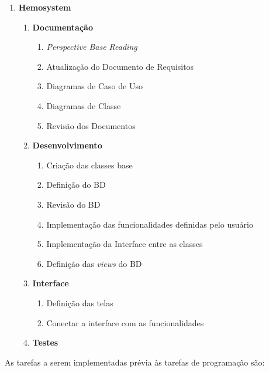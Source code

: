 \documentclass[12pt,a4paper,final]{article}
\begin{document}
\begin{enumerate}
\item \textbf{Hemosystem}
\begin{enumerate}[label*=\arabic*.]
\item \textbf{Documentação}
\begin{enumerate}[label*=\arabic*.]
\item \textit{Perspective Base Reading}
\item Atualização do Documento de Requisitos
\item Diagramas de Caso de Uso
\item Diagramas de Classe
\item Revisão dos Documentos
\end{enumerate}
\item \textbf{Desenvolvimento}
\begin{enumerate}[label*=\arabic*.]
\item Criação das classes base
\item Definição do BD
\item Revisão do BD
\item Implementação das funcionalidades definidas pelo usuário
\item Implementação da Interface entre as classes
\item Definição das \textit{views} do BD
\end{enumerate}
\item \textbf{Interface}
\begin{enumerate}[label*=\arabic*.]
\item Definição das telas
\item Conectar a interface com as funcionalidades
\end{enumerate}
\item \textbf{Testes}

\end{enumerate}
\end{enumerate}


\newpage
As tarefas a serem implementadas prévia às tarefas de programação são:
\end{document}
